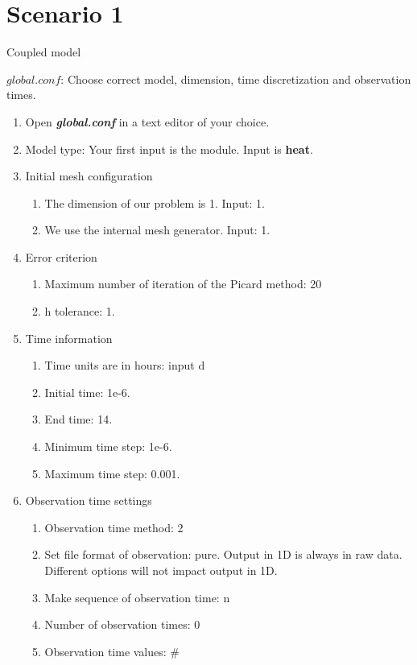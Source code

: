 \section*{Scenario 1}

Coupled model

$global.conf$: Choose correct model, dimension, time discretization and observation times.
\begin{enumerate}
\item Open \textbf{\emph{global.conf}} in a text editor of your choice. 
\item Model type: Your first input is the module. Input is \textbf{heat}.
\item Initial mesh configuration \begin{enumerate}
\item The dimension of our problem is 1. Input: 1.
\item We use the internal mesh generator. Input: 1. 
\end{enumerate}
\item Error criterion \begin{enumerate} 
\item Maximum number of iteration of the Picard method: 20 
\item h tolerance: 1.
\end{enumerate}
\item Time information 
\begin{enumerate} 
\item Time units are in hours: input d
\item Initial time: 1e-6.
\item End time: 14.
\item Minimum time step: 1e-6.
\item Maximum time step: 0.001.
\end{enumerate}
\item Observation time settings \begin{enumerate}
\item Observation time method: 2
\item Set file format of observation: pure. Output in 1D is always in raw data. Different options will not impact output in 1D.
\item Make sequence of observation time: n
\item Number of observation times: 0
\item Observation time values: \#
\end{enumerate}

\end{enumerate}
